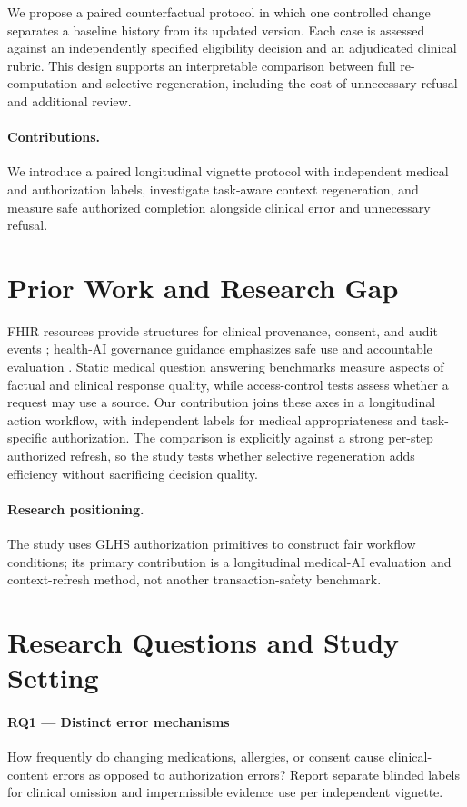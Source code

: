 \documentclass[11pt,a4paper]{article}
\begin{document}
We propose a paired counterfactual protocol in which one controlled change separates a baseline history from its updated version. Each case is assessed against an independently specified eligibility decision and an adjudicated clinical rubric. This design supports an interpretable comparison between full re-computation and selective regeneration, including the cost of unnecessary refusal and additional review.

\paragraph{Contributions.} We introduce a paired longitudinal vignette protocol with independent medical and authorization labels, investigate task-aware context regeneration, and measure safe authorized completion alongside clinical error and unnecessary refusal.

\section{Prior Work and Research Gap}
FHIR resources provide structures for clinical provenance, consent, and audit events \cite{fhir2023}; health-AI governance guidance emphasizes safe use and accountable evaluation \cite{who2021}. Static medical question answering benchmarks measure aspects of factual and clinical response quality, while access-control tests assess whether a request may use a source. Our contribution joins these axes in a longitudinal action workflow, with independent labels for medical appropriateness and task-specific authorization. The comparison is explicitly against a strong per-step authorized refresh, so the study tests whether selective regeneration adds efficiency without sacrificing decision quality.

\paragraph{Research positioning.} The study uses GLHS authorization primitives to construct fair workflow conditions; its primary contribution is a longitudinal medical-AI evaluation and context-refresh method, not another transaction-safety benchmark.

\section{Research Questions and Study Setting}
\paragraph{RQ1 — Distinct error mechanisms} How frequently do changing medications, allergies, or consent cause clinical-content errors as opposed to authorization errors? Report separate blinded labels for clinical omission and impermissible evidence use per independent vignette.
\end{document}

